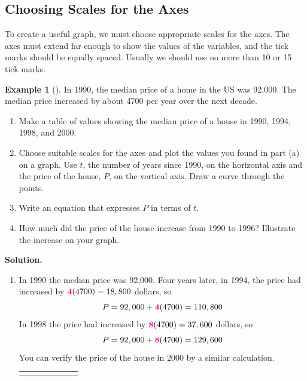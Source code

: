 \documentclass[10pt,]{book}
\theoremstyle{plain}
\theoremstyle{definition}
\theoremstyle{definition}
\newtheorem{example}[theorem]{Example}
\theoremstyle{definition}
\theoremstyle{definition}
\numberwithin{equation}{part}
\newcommand{\hrulethick} {\noalign{\hrule height 0.11em}}
\newcommand{\alert}[1]{\boldsymbol{\color{magenta}{#1}}}
\begin{document}
\subsection[{Choosing Scales for the Axes}]{Choosing Scales for the Axes}\label{subsection-2}
To create a useful graph, we must choose appropriate scales for the axes.  The axes must extend far enough to show the values of the variables, and the tick marks should be equally spaced.  Usually we should use no more than 10 or 15 tick marks.%
\begin{example}[]\label{example-home-price}
In 1990, the median price of a home in the US was \textdollar{}92,000.  The median price increased by about \textdollar{}4700 per year over the next decade. \leavevmode%
\begin{enumerate}[label=\alph*]
\item\hypertarget{li-31}{}Make a table of values showing the median price of a house in 1990, 1994, 1998, and 2000.%
\item\hypertarget{li-32}{}Choose suitable scales for the axes and plot the values you found in part (a) on a graph. Use \(t\), the number of years since 1990, on the horizontal axis and the price of the house, \(P\), on the vertical axis.  Draw a curve through the points.%
\item\hypertarget{li-33}{}Write an equation that expresses \(P\) in terms of \(t\).%
\item\hypertarget{li-34}{}How much did the price of the house increase from 1990 to 1996?  Illustrate the increase on your graph.%
\end{enumerate}
%
\par\medskip\noindent%
\textbf{Solution.}\quad \leavevmode%
\begin{enumerate}[label=\alph*]
\item\hypertarget{li-35}{}In 1990 the median price was \textdollar{}92,000.  Four years later, in 1994, the price had increased by \(\alert{4}(4700)=18,800\) dollars, so%
\begin{equation*}
P=92,000+\alert{4}(4700)=110,800
\end{equation*}
In 1998 the price had increased by \(\alert{8}(4700)=37,600\)  dollars, so%
\begin{equation*}
P=92,000+\alert{8}(4700)=129,600
\end{equation*}
You can verify the price of the house in 2000 by a similar calculation.%
\begin{table}
\centering
\begin{tabular}{AcAcAcA}\hrulethick

\end{tabular}
\end{table}
\end{enumerate}
\end{example}
\end{document}
